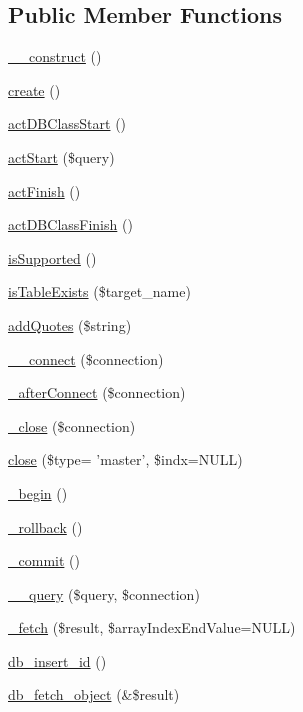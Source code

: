\subsection*{Public Member Functions}
\begin{DoxyCompactItemize}
\item 
\hyperlink{classDBMysqliConnectWrapper_a47a5493c797079dd98d14e8d4a2c4c55}{\+\_\+\+\_\+construct} ()
\item 
\hyperlink{classDBMysqliConnectWrapper_ae636ea874e1e7c6d87eb78b748908be5}{create} ()
\item 
\hyperlink{classDBMysqliConnectWrapper_a1e2cb430f69d5faa8ec381225e265ae8}{act\+D\+B\+Class\+Start} ()
\item 
\hyperlink{classDBMysqliConnectWrapper_a0492e7b248a33424b63cfc06c9ecad49}{act\+Start} (\$query)
\item 
\hyperlink{classDBMysqliConnectWrapper_a93242065ae095764aa83ec59b72b99a4}{act\+Finish} ()
\item 
\hyperlink{classDBMysqliConnectWrapper_a178205b2d0ac84a135a7966c6d1a7652}{act\+D\+B\+Class\+Finish} ()
\item 
\hyperlink{classDBMysqliConnectWrapper_a05d72d9861f38afca7ebefc8d0deee42}{is\+Supported} ()
\item 
\hyperlink{classDBMysqliConnectWrapper_ad7b2d3a6878dbe986ec3305b49821fe5}{is\+Table\+Exists} (\$target\+\_\+name)
\item 
\hyperlink{classDBMysqliConnectWrapper_aaac2cf39bf863ad09280c8d2ff04016e}{add\+Quotes} (\$string)
\item 
\hyperlink{classDBMysqliConnectWrapper_a9562cd8ee77b7ca3b4bb9a5adda98ed3}{\+\_\+\+\_\+connect} (\$connection)
\item 
\hyperlink{classDBMysqliConnectWrapper_a231b793b48baa07db372a216eead7191}{\+\_\+after\+Connect} (\$connection)
\item 
\hyperlink{classDBMysqliConnectWrapper_a91a568004cdddbbc7263a60813b61e5d}{\+\_\+close} (\$connection)
\item 
\hyperlink{classDBMysqliConnectWrapper_a97d4945bae7b5ec0ecd1a424180b50ed}{close} (\$type= 'master', \$indx=N\+U\+L\+L)
\item 
\hyperlink{classDBMysqliConnectWrapper_a56f87e9b77b97ef51371607f7158d285}{\+\_\+begin} ()
\item 
\hyperlink{classDBMysqliConnectWrapper_a4cace4e29e19db1ce3ec3e40ba8d4598}{\+\_\+rollback} ()
\item 
\hyperlink{classDBMysqliConnectWrapper_a20372347210175ffdc5b243973e798fb}{\+\_\+commit} ()
\item 
\hyperlink{classDBMysqliConnectWrapper_afb46a3ecf78bbb2e841d40bbd63171f9}{\+\_\+\+\_\+query} (\$query, \$connection)
\item 
\hyperlink{classDBMysqliConnectWrapper_a8b5305cd3ad01a2a134b7f9bc47a6326}{\+\_\+fetch} (\$result, \$array\+Index\+End\+Value=N\+U\+L\+L)
\item 
\hyperlink{classDBMysqliConnectWrapper_ad98fb22767de37a5be5572634c4542bc}{db\+\_\+insert\+\_\+id} ()
\item 
\hyperlink{classDBMysqliConnectWrapper_a67f5cb52bb8ee59f39634073bb865b8c}{db\+\_\+fetch\+\_\+object} (\&\$result)
\end{DoxyCompactItemize}
